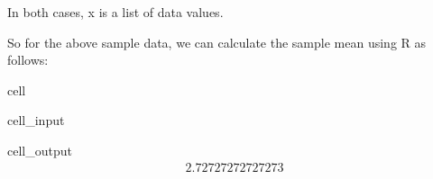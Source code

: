 \documentclass[letterpaper,10pt,english]{jupyterBook}
\begin{document}
\begin{sphinxVerbatim}[commandchars=\\\{\}]
\end{sphinxVerbatim}

\sphinxAtStartPar
In both cases, x is a list of data values.

\sphinxAtStartPar
So for the above sample data, we can calculate the sample mean using R as follows:

\begin{sphinxuseclass}{cell}\begin{sphinxVerbatimInput}

\begin{sphinxuseclass}{cell_input}
\begin{sphinxVerbatim}[commandchars=\\\{\}]

\end{sphinxVerbatim}

\end{sphinxuseclass}\end{sphinxVerbatimInput}
\begin{sphinxVerbatimOutput}

\begin{sphinxuseclass}{cell_output}\begin{equation*}
\begin{split}2.72727272727273\end{split}
\end{equation*}
\end{sphinxuseclass}\end{sphinxVerbatimOutput}

\end{sphinxuseclass}
\end{document}
